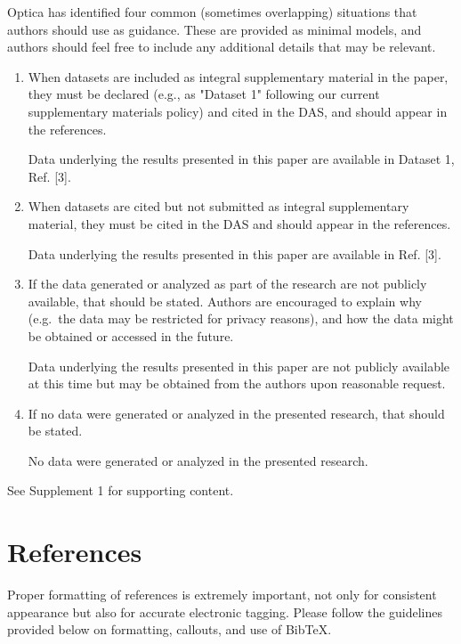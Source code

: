\documentclass{optica-article}
\begin{document}
\begin{backmatter}
Optica has identified four common (sometimes overlapping) situations that authors should use as guidance. These are provided as minimal models, and authors should feel free to
include any additional details that may be relevant.

\begin{enumerate}
\item When datasets are included as integral supplementary material in the paper, they must be declared (e.g., as "Dataset 1" following our current supplementary materials policy) and cited in the DAS, and should appear in the references.

 Data underlying the results presented in this paper are available in Dataset 1, Ref. [3].

\bigskip

\item When datasets are cited but not submitted as integral supplementary material, they must be cited in the DAS and should appear in the references.

 Data underlying the results presented in this paper are available in Ref. [3].

\bigskip

\item If the data generated or analyzed as part of the research are not publicly available, that should be stated. Authors are encouraged to explain why (e.g.~the data may be restricted for privacy reasons), and how the data might be obtained or accessed in the future.

 Data underlying the results presented in this paper are not publicly available at this time but may be obtained from the authors upon reasonable request.

\bigskip

\item If no data were generated or analyzed in the presented research, that should be stated.

 No data were generated or analyzed in the presented research.
\end{enumerate}


See Supplement 1 for supporting content. 

\end{backmatter}

\section{References}
\label{sec:refs}
Proper formatting of references is extremely important, not only for consistent appearance but also for accurate electronic tagging. Please follow the guidelines provided below on formatting, callouts, and use of Bib\TeX.
\end{document}
